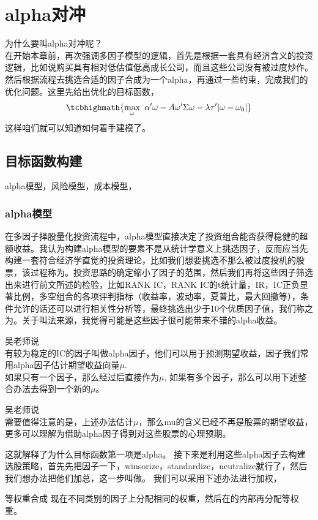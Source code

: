\documentclass[12pt]{article}
\begin{document}
\section{alpha对冲}
为什么要叫alpha对冲呢？\\
在开始本章前，再次强调多因子模型的逻辑，首先是根据一套具有经济含义的投资逻辑，比如说购买具有相对低估值低高成长公司，而且这些公司没有被过度炒作。然后根据流程去挑选合适的因子合成为一个alpha，再通过一些约束，完成我们的优化问题。这里先给出优化的目标函数，
$$
\tcbhighmath{\max_{\omega} \ \alpha^\prime \omega - A\omega^\prime \Sigma \omega - \lambda \tau^\prime |\omega-\omega_0|}
$$
这样咱们就可以知道如何着手建模了。
\subsection{目标函数构建}
alpha模型，风险模型，成本模型，

\subsubsection{alpha模型}
在多因子择股量化投资流程中，alpha模型直接决定了投资组合能否获得稳健的超额收益。我认为构建alpha模型的要素不是从统计学意义上挑选因子，反而应当先构建一套符合经济学直觉的投资理论，比如我们想要挑选不那么被过度投机的股票，该过程称为。投资思路的确定缩小了因子的范围，然后我们再将这些因子筛选出来进行前文所述的检验，比如RANK IC，RANK IC的t统计量，IR，IC正负显著比例，多空组合的各项评判指标（收益率，波动率，夏普比，最大回撤等），条件允许的话还可以进行相关性分析等，最终挑选出少于10个优质因子值，我们称之为。关于叫法来源，我觉得可能是这些因子很可能带来不错的alpha收益。\par
\begin{sremark}{}{}吴老师说 \\
有较为稳定的IC的因子叫做alpha因子，他们可以用于预测期望收益，因子我们常用alpha因子估计期望收益向量$\mu$. \\
如果只有一个因子，那么经过后直接作为$\mu$, 如果有多个因子，那么可以用下述整合办法去得到一个新的$\mu$。 
\end{sremark}

\begin{sremark}{}{}吴老师说 \\
需要值得注意的是，上述办法估计$\mu$，那么mu的含义已经不再是股票的期望收益，更多可以理解为借助alpha因子得到对这些股票的心理预期。
\end{sremark}

这就解释了为什么目标函数第一项是alpha。
接下来是利用这些alpha因子去构建选股策略，首先先把因子一下，winsorize，standardize，neutralize就行了，然后我们想办法把他们加总，这一步叫做。
我们可以采用下述办法进行加权，
\begin{sdefinition}{等权重合成}{}
现在不同类别的因子上分配相同的权重，然后在的内部再分配等权重。
\end{sdefinition}
\end{document}

